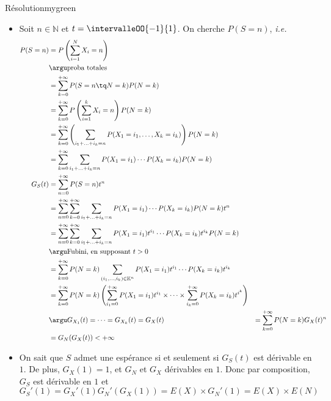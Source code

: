     \begin{demo}{Résolution}{mygreen}
        \begin{itemize}[label = (\alph*)]
            \item Soit $n \in \mathbb{N}$ et $t = \intervalleOO{-1}{1}$. On cherche $P (S = n)$, \textit{i.e.} 
            \begin{align*}
                P(S = n) 
                &= P\left(\sum_{i=1}^{N} X_i = n\right) \\
                &\argu \text{proba totales} \\
                &= \sum_{k=0}^{+\infty} P(S = n \tq N = k) P(N = k) \\
                &= \sum_{k=0}^{+\infty} P\left(\sum_{i=1}^{k} X_i = n\right) P(N=k) \\
                &= \sum_{k=0}^{+\infty} \left(\sum_{i_1 + \ldots + i_k = n} P(X_1 = i_1,\ldots,X_k = i_k)\right) P(N = k) \\
                &= \sum_{k=0}^{+\infty} \sum_{i_1 + \ldots + i_k = n} P(X_1 = i_1) \cdots P(X_k = i_k) P(N = k) \\
                G_S(t) 
                &= \sum_{n=0}^{+\infty} P(S = n) t^n \\
                &= \sum_{n=0}^{+\infty} \sum_{k=0}^{+\infty} \sum_{i_1 + \ldots + i_k = n} P(X_1 = i_1) \cdots P(X_k = i_k) P(N = k) t^n \\
                &= \sum_{n=0}^{+\infty} \sum_{k=0}^{+\infty} \sum_{i_1 + \ldots + i_k = n} P(X_1 = i_1)t^{i_1} \cdots P(X_k = i_k) t^{i_k} P(N = k) \\
                &\argu \text{Fubini, en supposant } t > 0 \\
                &= \sum_{k=0}^{+\infty} P(N = k) \sum_{(i_1,\ldots,i_k) \in \mathbb{K}^n} P(X_1 = i_1)t^{i_1} \cdots P(X_k = i_k) t^{i_k} \\ 
                &= \sum_{k=0}^{+\infty} P(N = k) \left(\sum_{i_1 = 0}^{+\infty} P(X_1 = i_1) t^{i_1} \times \cdots \times \sum_{i_k = 0}^{+\infty} P(X_k = i_k) t^{i^k}\right) \\
                &\argu G_{X_1}(t) = \cdots = G_{X_k}(t) = G_X(t)
                &= \sum_{k=0}^{+\infty} P(N = k) G_X(t)^n \\
                &= G_N(G_X(t)) < +\infty 
            \end{align*}
            \item On sait que $S$ admet une espérance si et seulement si $G_S(t)$ est dérivable en $1$. De plus, $G_X(1) = 1$, et $G_N$ et $G_X$ dérivables en $1$. Donc par composition, $G_S$ est dérivable en $1$ et 
            \[ G_S'(1) = G_X'(1) G_N'(G_X(1)) = E(X) \times G_N'(1) = E(X) \times E(N) \]   
        \end{itemize}
    \end{demo}

